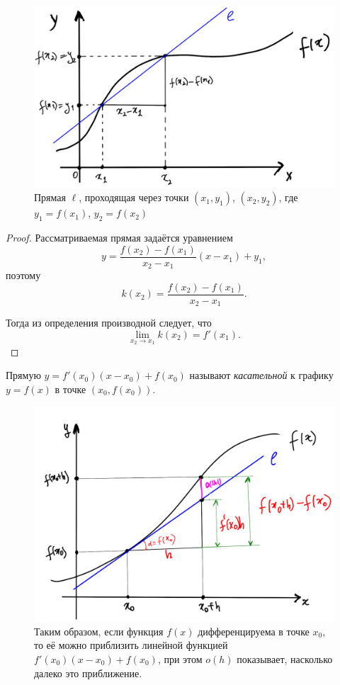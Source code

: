 \begin{figure}[h!]
    \centering
    \includegraphics[scale = 0.4]{images/line_and_f'.jpg}
    \caption{Прямая $\ell$, проходящая через точки $(x_1,y_1)$, $(x_2,y_2)$, где $y_1 = f(x_1)$, $y_2 = f(x_2)$}
    \label{fig:enter-label}
\end{figure}

\begin{proof}
    Рассматриваемая прямая задаётся уравнением 
\[
 y = \frac{f(x_2) - f(x_1)}{x_2 - x_1}(x-x_1) +y_1,
\]
поэтому
\[
 k(x_2)  = \frac{f(x_2) - f(x_1)}{x_2 - x_1}.
\]

Тогда из определения производной следует, что
\[
 \lim_{x_2 \to x_1}k(x_2) = f'(x_1).
\]
\end{proof}

\begin{definition}
    Прямую $y = f'(x_0)(x-x_0) + f(x_0)$ называют \textit{касательной} к графику $y = f(x)$ в точке $(x_0, f(x_0)).$
\end{definition}

\begin{figure}[h!]
    \centering
    \includegraphics[scale= 0.4]{images/tan_and_f.jpg}
    \caption{Таким образом, если функция $f(x)$ дифференцируема в точке $x_0$, то её можно приблизить линейной функцией $f'(x_0)(x-x_0) +f(x_0)$, при этом $o(h)$ показывает, насколько далеко это приближение.}
    \label{fig:enter-label}
\end{figure}





